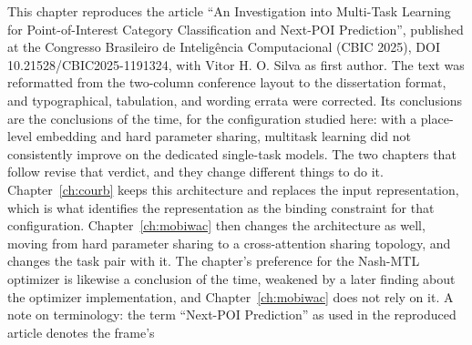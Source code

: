 \begin{chapterpreface}
This chapter reproduces the article ``An Investigation into Multi-Task Learning for
Point-of-Interest Category Classification and Next-POI Prediction'', published at the
Congresso Brasileiro de Intelig\^encia Computacional (CBIC 2025), DOI
10.21528/CBIC2025-1191324, with Vitor H. O. Silva as first author. The text was
reformatted from the two-column conference layout to the dissertation format, and
typographical, tabulation, and wording errata were corrected. Its
conclusions are the conclusions of the time, for the configuration studied here: with a
place-level embedding and hard parameter sharing, multitask learning did not
consistently improve on the dedicated single-task models. The two chapters that follow
revise that verdict, and they change different things to do it.
Chapter~\ref{ch:courb} keeps this architecture and replaces the input representation,
which is what identifies the representation as the binding constraint for that configuration.
Chapter~\ref{ch:mobiwac} then changes the architecture as well, moving from hard
parameter sharing to a cross-attention sharing topology, and changes the task pair with
it. The chapter's preference for the Nash-MTL optimizer is likewise
a conclusion of the time, weakened by a later finding about the optimizer
implementation, and Chapter~\ref{ch:mobiwac} does not rely on it. A note on terminology:
the term ``Next-POI Prediction'' as used in the reproduced article denotes the frame's

\end{chapterpreface}
